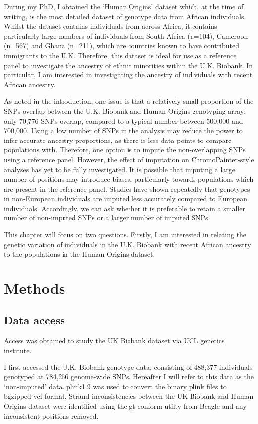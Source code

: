 During my PhD, I obtained the `Human Origins' dataset which, at the time of writing, is the most detailed dataset of genotype data from African individuals. Whilst the dataset contains individuals from across Africa, it contains particularly large numbers of individuals from South Africa (n=104), Cameroon (n=567) and Ghana (n=211), which are countries known to have contributed immigrants to the U.K. Therefore, this dataset is ideal for use as a reference panel to investigate the ancestry of ethnic minorities within the U.K. Biobank. In particular, I am interested in investigating the ancestry of individuals with recent African ancestry. 

As noted in the introduction, one issue is that a relatively small proportion of the SNPs overlap between the U.K. Biobank and Human Origins genotyping array; only 70,776 SNPs overlap, compared to a typical number between 500,000 and 700,000. Using a low number of SNPs in the analysis may reduce the power to infer accurate ancestry proportions, as there is less data points to compare populations with. Therefore, one option is to impute the non-overlapping SNPs using a reference panel. However, the effect of imputation on ChromoPainter-style analyses has yet to be fully investigated. It is possible that imputing a large number of positions may introduce biases, particularly towards populations which are present in the reference panel. Studies have shown repeatedly that genotypes in non-European individuals are imputed less accurately compared to European individuals. Accordingly, we can ask whether it is preferable to retain a smaller number of non-imputed SNPs or a larger number of imputed SNPs. 

This chapter will focus on two questions. Firstly, I am interested in relating the genetic variation of individuals in the U.K. Biobank with recent African ancestry to the populations in the Human Origins dataset. 


\section{Methods}

\subsection{Data access}

Access was obtained to study the UK Biobank dataset via UCL genetics institute. 

I first accessed the U.K. Biobank genotype data, consisting of 488,377 individuals genotyped at 784,256 genome-wide SNPs. Hereafter I will refer to this data as the `non-imputed' data. plink1.9 \cite{purcell2007plink} was used to convert the binary plink files to bgzipped vcf format. Strand inconsistencies between the UK Biobank and Human Origins dataset were identified using the gt-conform utilty from Beagle and any inconsistent positions removed. 

